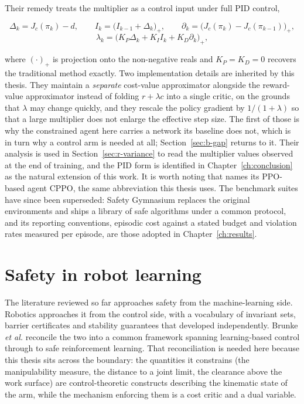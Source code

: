 Their remedy treats the multiplier as a control input under full PID control,

\begin{equation}\label{eq:b-pid}
\Delta_{k}=J_{c}(\pi_{k})-d,\qquad
I_{k}=\bigl(I_{k-1}+\Delta_{k}\bigr)_{+},\qquad
\partial_{k}=\bigl(J_{c}(\pi_{k})-J_{c}(\pi_{k-1})\bigr)_{+},
\end{equation}
\begin{equation}\label{eq:b-pidlam}
\lambda_{k}=\bigl(K_{P}\Delta_{k}+K_{I}I_{k}+K_{D}\partial_{k}\bigr)_{+},
\end{equation}

where \((\cdot)_{+}\) is projection onto the non-negative reals and \(K_{P}=K_{D}=0\) recovers
the traditional method exactly. Two implementation details are inherited by this thesis. They
maintain a \emph{separate} cost-value approximator alongside the reward-value approximator
instead of folding \(r+\lambda c\) into a single critic, on the grounds that \(\lambda\) may
change quickly, and they rescale the policy gradient by \(1/(1+\lambda)\) so that a large
multiplier does not enlarge the effective step size. The first of those is why the constrained
agent here carries a network its baseline does not, which is in turn why a control arm is needed
at all; Section~\ref{sec:b-gap} returns to it. Their analysis is used in
Section~\ref{sec:r-variance} to read the multiplier values observed at the end of training, and
the PID form is identified in Chapter~\ref{ch:conclusion} as the natural extension of this work.
It is worth noting that \cite{stooke2020pid} names its PPO-based agent CPPO, the same
abbreviation this thesis uses. The benchmark suites have since been superseded: Safety Gymnasium
\cite{ji2023safetygymnasium} replaces the original environments and ships a library of safe
algorithms under a common protocol, and its reporting conventions, episodic cost against a
stated budget and violation rates measured per episode, are those adopted in
Chapter~\ref{ch:results}.

\section{Safety in robot learning}\label{sec:b-roboticsafety}

The literature reviewed so far approaches safety from the machine-learning side. Robotics
approaches it from the control side, with a vocabulary of invariant sets, barrier certificates
and stability guarantees that developed independently. Brunke \emph{et al.}
\cite{brunke2022safe} reconcile the two into a common framework spanning learning-based control
through to safe reinforcement learning. That reconciliation is needed here because this thesis
sits across the boundary: the quantities it constrains (the manipulability measure, the distance
to a joint limit, the clearance above the work surface) are control-theoretic constructs
describing the kinematic state of the arm, while the mechanism enforcing them is a cost critic
and a dual variable.

